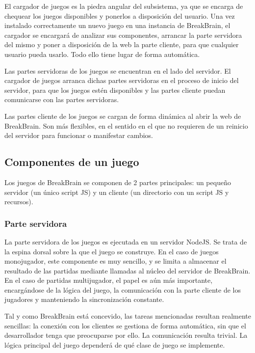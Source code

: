 El cargador de juegos es la piedra angular del subsistema, ya que se encarga de chequear los juegos disponibles y ponerlos a disposición del usuario. Una vez instalado correctamente un nuevo juego en una instancia de BreakBrain, el cargador se encargará de analizar sus componentes, arrancar la parte servidora del mismo y poner a disposición de la web la parte cliente, para que cualquier usuario pueda usarlo. Todo ello tiene lugar de forma automática.

Las partes servidoras de los juegos se encuentran en el lado del servidor. El cargador de juegos arranca dichas partes servidoras en el proceso de inicio del servidor, para que los juegos estén disponibles y las partes cliente puedan comunicarse con las partes servidoras.

Las partes cliente de los juegos se cargan de forma dinámica al abrir la web de BreakBrain. Son más flexibles, en el sentido en el que no requieren de un reinicio del servidor para funcionar o manifestar cambios.

\subsection{Componentes de un juego}

Los juegos de BreakBrain se componen de 2 partes principales: un pequeño servidor (un único script JS) y un cliente (un directorio con un script JS y recursos).

\subsubsection{Parte servidora}

La parte servidora de los juegos es ejecutada en un servidor NodeJS. Se trata de la espina dorsal sobre la que el juego se construye. En el caso de juegos monojugador, este componente es muy sencillo, y se limita a almacenar el resultado de las partidas mediante llamadas al núcleo del servidor de BreakBrain. En el caso de partidas multijugador, el papel es aún más importante, encargándose de la lógica del juego, la comunicación con la parte cliente de los jugadores y manteniendo la sincronización constante.

Tal y como BreakBrain está concevido, las tareas mencionadas resultan realmente sencillas: la conexión con los clientes se gestiona de forma automática, sin que el desarrollador tenga que preocuparse por ello. La comunicación resulta trivial. La lógica principal del juego dependerá de qué clase de juego se implemente.

